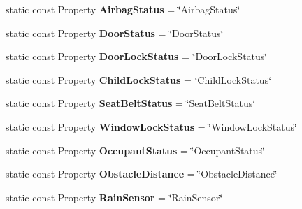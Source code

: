 \begin{DoxyCompactItemize}
\item 
\hypertarget{classVehicleProperty_a341a783cf4746bb7388ee460e62c309e}{static const Property {\bfseries Airbag\-Status} = \char`\"{}Airbag\-Status\char`\"{}}\label{classVehicleProperty_a341a783cf4746bb7388ee460e62c309e}

\item 
\hypertarget{classVehicleProperty_aec1cd341d1eda388b27e5e2c167f377b}{static const Property {\bfseries Door\-Status} = \char`\"{}Door\-Status\char`\"{}}\label{classVehicleProperty_aec1cd341d1eda388b27e5e2c167f377b}

\item 
\hypertarget{classVehicleProperty_a3d6b7274ee30b454864351c1c91bf694}{static const Property {\bfseries Door\-Lock\-Status} = \char`\"{}Door\-Lock\-Status\char`\"{}}\label{classVehicleProperty_a3d6b7274ee30b454864351c1c91bf694}

\item 
\hypertarget{classVehicleProperty_a8da7bc1ecdd1b8d0ca6e96a708b00ab2}{static const Property {\bfseries Child\-Lock\-Status} = \char`\"{}Child\-Lock\-Status\char`\"{}}\label{classVehicleProperty_a8da7bc1ecdd1b8d0ca6e96a708b00ab2}

\item 
\hypertarget{classVehicleProperty_a6189236af616f7e8326ccb1b45d005c4}{static const Property {\bfseries Seat\-Belt\-Status} = \char`\"{}Seat\-Belt\-Status\char`\"{}}\label{classVehicleProperty_a6189236af616f7e8326ccb1b45d005c4}

\item 
\hypertarget{classVehicleProperty_aa2db4c5710bc329bf294102a628e7c37}{static const Property {\bfseries Window\-Lock\-Status} = \char`\"{}Window\-Lock\-Status\char`\"{}}\label{classVehicleProperty_aa2db4c5710bc329bf294102a628e7c37}

\item 
\hypertarget{classVehicleProperty_a581909689c6ad9ffea21a4de61109150}{static const Property {\bfseries Occupant\-Status} = \char`\"{}Occupant\-Status\char`\"{}}\label{classVehicleProperty_a581909689c6ad9ffea21a4de61109150}

\item 
\hypertarget{classVehicleProperty_a0b3f901f17dd92086b59a1923b9124c4}{static const Property {\bfseries Obstacle\-Distance} = \char`\"{}Obstacle\-Distance\char`\"{}}\label{classVehicleProperty_a0b3f901f17dd92086b59a1923b9124c4}

\item 
\hypertarget{classVehicleProperty_aaf332f3700a7dabc3ebe138c8442c854}{static const Property {\bfseries Rain\-Sensor} = \char`\"{}Rain\-Sensor\char`\"{}}\label{classVehicleProperty_aaf332f3700a7dabc3ebe138c8442c854}


\end{DoxyCompactItemize}
